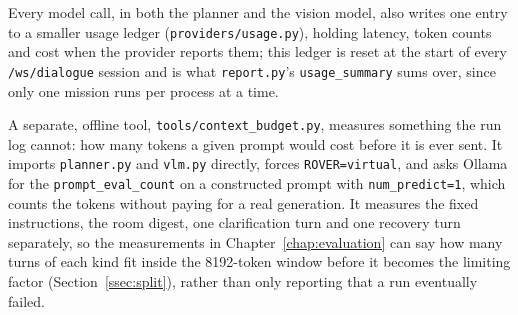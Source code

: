 Every model call, in both the planner and the vision model, also writes one
entry to a smaller usage ledger (\texttt{providers/usage.py}), holding latency,
token counts and cost when the provider reports them; this ledger is reset at
the start of every \texttt{/ws/dialogue} session and is what \texttt{report.py}'s
\texttt{usage\_summary} sums over, since only one mission runs per process at a
time.

A separate, offline tool, \texttt{tools/context\_budget.py}, measures something
the run log cannot: how many tokens a given prompt would cost before it is ever
sent. It imports \texttt{planner.py} and \texttt{vlm.py} directly, forces
\texttt{ROVER=virtual}, and asks Ollama for the \texttt{prompt\_eval\_count} on a
constructed prompt with \texttt{num\_predict=1}, which counts the tokens without
paying for a real generation. It measures the fixed instructions, the room
digest, one clarification turn and one recovery turn separately, so the
measurements in Chapter~\ref{chap:evaluation} can say how many turns of each kind
fit inside the 8192-token window before it becomes the limiting factor
(Section~\ref{ssec:split}), rather than only reporting that a run eventually
failed.
